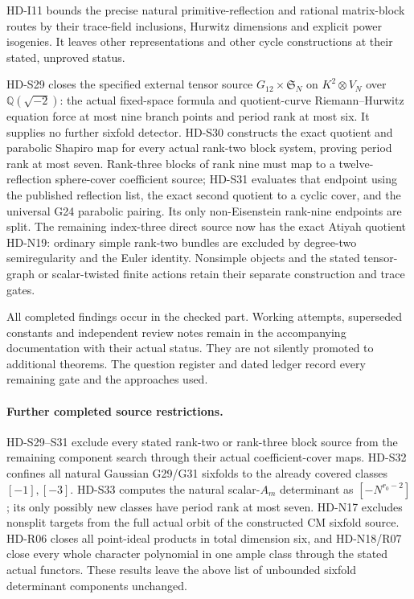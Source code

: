 HD-I11 bounds the precise natural primitive-reflection and rational
matrix-block routes by their trace-field inclusions, Hurwitz dimensions
and explicit power isogenies. It leaves other representations and
other cycle constructions at their stated, unproved status.

HD-S29 closes the specified external tensor source
$G_{12}\times\mathfrak S_N$ on $K^2\otimes V_N$ over
$\mathbb Q(\sqrt{-2})$: the actual fixed-space formula and quotient-curve
Riemann--Hurwitz equation force at most nine branch points and period rank
at most six. It supplies no further sixfold detector. HD-S30 constructs the exact
quotient and parabolic Shapiro map for every actual rank-two block
system, proving period rank at most seven. Rank-three blocks of rank
nine must map to a twelve-reflection sphere-cover coefficient source;
HD-S31 evaluates that endpoint using the published reflection list,
the exact second quotient to a cyclic cover, and the universal G24
parabolic pairing. Its only non-Eisenstein rank-nine endpoints are
split. The remaining index-three direct source now has the exact
Atiyah quotient HD-N19: ordinary simple rank-two bundles are excluded
by degree-two semiregularity and the Euler identity. Nonsimple objects
and the stated tensor-graph or scalar-twisted finite actions retain
their separate construction and trace gates.

All completed findings occur in the checked part. Working attempts,
superseded constants and independent review notes remain in the
accompanying documentation with their actual status. They are not
silently promoted to additional theorems. The question register and
dated ledger record every remaining gate and the approaches used.

\paragraph{Further completed source restrictions.}
HD-S29--S31 exclude every stated rank-two or rank-three block source
from the remaining component search through their actual coefficient-cover maps.
HD-S32 confines all natural Gaussian G29/G31 sixfolds to the already
covered classes $[-1],[-3]$. HD-S33 computes the natural scalar-$A_m$
determinant as $[-N^{r_0-2}]$; its only possibly new classes have
period rank at most seven. HD-N17 excludes nonsplit targets from the
full actual orbit of the constructed CM sixfold source. HD-R06 closes
all point-ideal products in total dimension six, and HD-N18/R07 close
every whole character polynomial in one ample class through the stated
actual functors. These results leave the above list of unbounded
sixfold determinant components unchanged.

